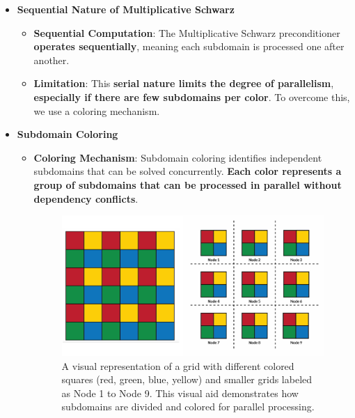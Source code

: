 \begin{itemize}
    \item[\textcolor{Red2}{\faIcon{times-circle}}] \textcolor{Red2}{\textbf{Sequential Nature of Multiplicative Schwarz}}
    \begin{itemize}
        \item[\textcolor{Red2}{\faIcon{times}}] \textcolor{Red2}{\textbf{Sequential Computation}}: The Multiplicative Schwarz preconditioner \textbf{operates sequentially}, meaning each subdomain is processed one after another.
        \item[\textcolor{Red2}{\faIcon{times}}] \textcolor{Red2}{\textbf{Limitation}}: This \textbf{serial nature limits the degree of parallelism}, \textbf{especially if there are few subdomains per color}. To overcome this, we use a coloring mechanism.
    \end{itemize}

    \item[\textcolor{Green3}{\faIcon{tools}}] \textcolor{Green3}{\textbf{Subdomain Coloring}}
    \begin{itemize}
        \item \textbf{Coloring Mechanism}: Subdomain coloring identifies independent subdomains that can be solved concurrently. \textbf{Each color represents a group of subdomains that can be processed in parallel without dependency conflicts}.
        \begin{figure}[!htp]
            \centering
            \includegraphics[width=.8\textwidth]{img/colouring-technique-1.pdf}
            \caption*{A visual representation of a grid with different colored squares (red, green, blue, yellow) and smaller grids labeled as Node 1 to Node 9. This visual aid demonstrates how subdomains are divided and colored for parallel processing.}
        \end{figure}
    \end{itemize}


\end{itemize}
